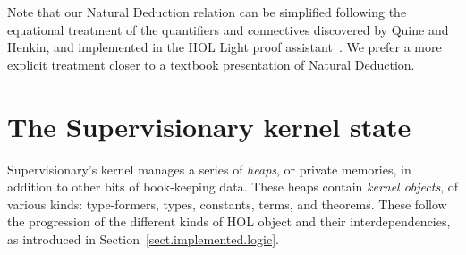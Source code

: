 \documentclass[a4paper, UKenglish, cleveref, autoref, thm-restate, colorlinks]{lipics-v2021}
\begin{document}
Note that our Natural Deduction relation can be simplified following the equational treatment of the quantifiers and connectives discovered by Quine and Henkin, and implemented in the HOL Light proof assistant~\cite{DBLP:conf/tphol/Harrison09a}.
We prefer a more explicit treatment closer to a textbook presentation of Natural Deduction.

\section{The Supervisionary kernel state}
\label{sect.the.kernel.state}

Supervisionary's kernel manages a series of \emph{heaps}, or private memories, in addition to other bits of book-keeping data.
These heaps contain \emph{kernel objects}, of various kinds: type-formers, types, constants, terms, and theorems.
These follow the progression of the different kinds of HOL object and their interdependencies, as introduced in Section~\ref{sect.implemented.logic}.
\end{document}
